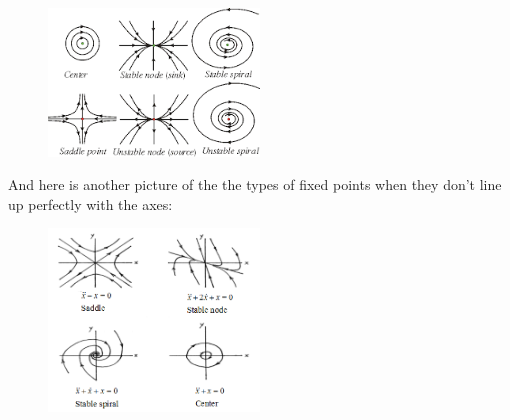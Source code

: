\documentclass[reqno]{amsart}
\theoremstyle{definition}
\begin{document}
\begin{figure}[htbp]
\includegraphics[width = 0.5\textwidth]{Summary}
\end{figure}

And here is another picture of the the types of fixed points when they don't line up perfectly with the axes:

\begin{figure}[htbp]
\includegraphics[width = 0.5\textwidth]{Summary1}
\end{figure}
\end{document}
